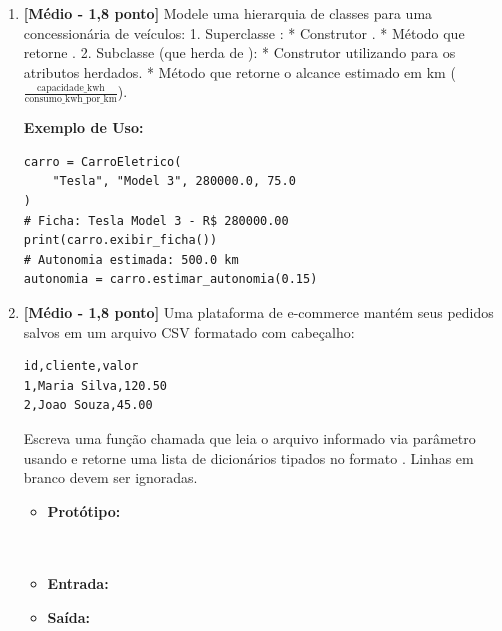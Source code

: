 \begin{enumerate}[label=\textbf{Q\arabic*.}, start=64]


\vspace{0.4cm}

\item \textbf{[Médio - 1,8 ponto]} Modele uma hierarquia de classes para uma concessionária de veículos:
1. Superclasse :
   * Construtor .
   * Método  que retorne .
2. Subclasse  (que herda de ):
   * Construtor  utilizando  para os atributos herdados.
   * Método  que retorne o alcance estimado em km ($\frac{\text{capacidade\_kwh}}{\text{consumo\_kwh\_por\_km}}$).

\textbf{Exemplo de Uso:}
\begin{verbatim}
carro = CarroEletrico(
    "Tesla", "Model 3", 280000.0, 75.0
)
# Ficha: Tesla Model 3 - R$ 280000.00
print(carro.exibir_ficha())
# Autonomia estimada: 500.0 km
autonomia = carro.estimar_autonomia(0.15)
\end{verbatim}



\vspace{0.4cm}

\item \textbf{[Médio - 1,8 ponto]} Uma plataforma de e-commerce mantém seus pedidos salvos em um arquivo CSV formatado com cabeçalho:
\begin{verbatim}
id,cliente,valor
1,Maria Silva,120.50
2,Joao Souza,45.00
\end{verbatim}
Escreva uma função chamada  que leia o arquivo informado via parâmetro usando  e retorne uma lista de dicionários tipados no formato . Linhas em branco devem ser ignoradas.

\begin{itemize}[leftmargin=*]
    \item \textbf{Protótipo:}\newline {}\\\\\\
    \item \textbf{Entrada:} 
    \item \textbf{Saída:} \\
\end{itemize}


\end{enumerate}
